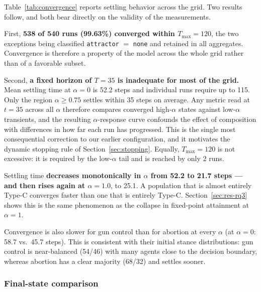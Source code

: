 Table~\ref{tab:convergence} reports settling behavior across the grid. Two results
follow, and both bear directly on the validity of the measurements.

First, \textbf{538 of 540 runs (99.63\%) converged within $T_{\max} = 120$}, the two
exceptions being classified \texttt{attractor} $=$ \texttt{none} and retained in all
aggregates. Convergence is therefore a property of the model across the whole grid rather
than of a favorable subset.

Second, \textbf{a fixed horizon of $T = 35$ is inadequate for most of the grid.} Mean
settling time at $\alpha = 0$ is 52.2 steps and individual runs require up to 115. Only
the region $\alpha \ge 0.75$ settles within 35 steps on average. Any metric read at
$t = 35$ across all $\alpha$ therefore compares converged high-$\alpha$ states against
low-$\alpha$ transients, and the resulting $\alpha$-response curve confounds the effect
of composition with differences in how far each run has progressed. This is the single
most consequential correction to our earlier configuration, and it motivates the dynamic
stopping rule of Section~\ref{sec:stopping}. Equally, $T_{\max} = 120$ is not excessive:
it is required by the low-$\alpha$ tail and is reached by only 2 runs.

Settling time \textbf{decreases monotonically in $\alpha$ from 52.2 to 21.7 steps ---
and then rises again at $\alpha = 1.0$}, to 25.1. A population that is almost entirely
Type-C converges faster than one that is entirely Type-C. Section~\ref{sec:res-rq3}
shows this is the same phenomenon as the collapse in fixed-point attainment at
$\alpha = 1$.

Convergence is also slower for gun control than for abortion at every $\alpha$ (at
$\alpha = 0$: 58.7 vs.\ 45.7 steps). This is consistent with their initial stance
distributions: gun control is near-balanced (54/46) with many agents close to the
decision boundary, whereas abortion has a clear majority (68/32) and settles sooner.

\subsubsection{Final-state comparison}
\label{sec:res-table}

